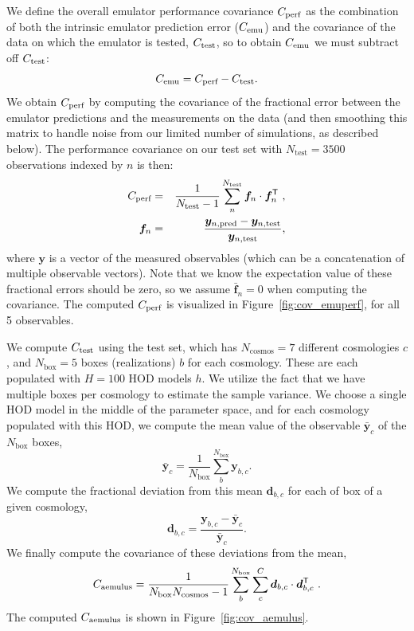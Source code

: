 We define the overall emulator performance covariance $C_\text{perf}$ as the combination of both the intrinsic emulator prediction error ($C_\text{emu}$) and the covariance of the data on which the emulator is tested, $C_\text{test}$, so to obtain $C_\text{emu}$ we must subtract off $C_\text{test}$:
\begin{equation}
     C_\text{emu} = C_\text{perf} - C_\text{test}.
\end{equation}
We obtain $C_\text{perf}$ by computing the covariance of the fractional error between the emulator predictions and the measurements on the data (and then smoothing this matrix to handle noise from our limited number of simulations, as described below).
The performance covariance on our test set with $N_\mathrm{test}=3500$ observations indexed by $n$ is then:
\begin{eqnarray}
    \label{eq:frac_pred}
    C_\text{perf} &=& \frac{1}{N_\mathrm{test}-1} \sum_n^{N_\mathrm{test}} \bm{f}_n \cdot \bm{f}_n^{\mathsf{T}} ~, \\
    \bm{f}_n &=& \frac{ \bm{y}_{n,\mathrm{pred}} - \bm{y}_{n,\mathrm{test}} }{ \bm{y}_{n,\mathrm{test}} },
\end{eqnarray}
where $\bm{y}$ is a vector of the measured observables (which can be a concatenation of multiple observable vectors).
Note that we know the expectation value of these fractional errors should be zero, so we assume $\bar{\bm{f}}_{n}=0$ when computing the covariance.
The computed $C_\text{perf}$ is visualized in Figure~\ref{fig:cov_emuperf}, for all 5 observables.

We compute $C_\text{test}$ using the \aemulus test set, which has $N_\mathrm{cosmos}=7$ different cosmologies $c$, and $N_\mathrm{box}=5$ boxes (realizations) $b$ for each cosmology. 
These are each populated with $H=100$ HOD models $h$. 
We utilize the fact that we have multiple boxes per cosmology to estimate the sample variance.
We choose a single HOD model in the middle of the parameter space, and for each cosmology populated with this HOD, we compute the mean value of the observable $\bar{\bm{y}}_{c}$ of the $N_\mathrm{box}$ boxes,
\begin{equation}
    \bar{\bm{y}}_{c} = \frac{1}{N_\mathrm{box}} \sum_b^{N_\mathrm{box}} {\bm{y}_{b,c}} .
\end{equation}
We compute the fractional deviation from this mean $\bm{d}_{b,c}$ for each of box of a given cosmology,
\begin{equation}
    \bm{d}_{b,c} = \frac{ {\bm{y}_{b,c} - \bar{\bm{y}}_{c}} } {\bar{\bm{y}}_{c}} .
\end{equation}
We finally compute the covariance of these deviations from the mean,
\begin{equation}
    C_\text{aemulus} = \frac{1}{N_\mathrm{box}N_\mathrm{cosmos}-1} \sum_{b}^{N_\mathrm{box}} \sum_{c}^C \bm{d}_{b,c} \cdot \bm{d}_{b,c}^{\mathsf{T}} ~.
\end{equation}
The computed $C_\text{aemulus}$ is shown in Figure~\ref{fig:cov_aemulus}.

